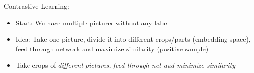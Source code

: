 \vspace{0.5em}
\b{Contrastive Learning:}
\begin{itemize}
    \item Start: We have multiple pictures without any label
    \item Idea: Take one picture, divide it into different crops/parts (embedding space), feed through network and maximize similarity (positive sample)
    \item Take crops of \it{different} pictures, feed through net and \it{minimize} similarity
\end{itemize}
\newpage